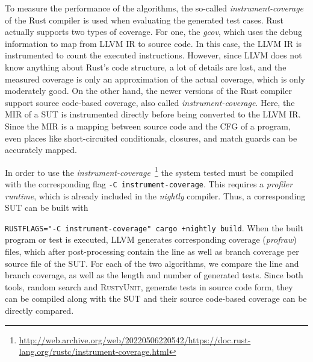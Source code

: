 \documentclass[paper=a4,%
  twoside,%
  BCOR4mm,%
  abstract=true,%
  toc=bibliography,%
  chapterprefix=true,%
  toc=bibliographynumbered,%
  open=right,%
  english,%
  pagesize=pdftex]{scrreprt}
\newcommand{\tech}{\textsc{RustyUnit}\xspace}
\newcommand{\mir}{\ac{MIR}\xspace}
\newcommand{\cfg}{\ac{CFG}\xspace}
\newcommand{\sut}{\ac{SUT}\xspace}
\begin{document}

To measure the performance of the algorithms, the so-called \emph{instrument-coverage} of the Rust compiler is used when evaluating the generated test cases. Rust actually supports two types of coverage. For one, the \emph{gcov}, which uses the debug information to map from LLVM \ac{IR} to source code. In this case, the LLVM \ac{IR} is instrumented to count the executed instructions. However, since LLVM does not know anything about Rust's code structure, a lot of details are lost, and the measured coverage is only an approximation of the actual coverage, which is only moderately good. On the other hand, the newer versions of the Rust compiler support source code-based coverage, also called \emph{instrument-coverage}. Here, the \mir of a \sut is instrumented directly before being converted to the LLVM \ac{IR}. Since the \mir is a mapping between source code and the \cfg of a program, even places like short-circuited conditionals, closures, and match guards can be accurately mapped.

In order to use the \emph{instrument-coverage}~\footnote{\url{http://web.archive.org/web/20220506220542/https://doc.rust-lang.org/rustc/instrument-coverage.html}} the system tested must be compiled with the corresponding flag \texttt{-C instrument-coverage}. This requires a \emph{profiler runtime}, which is already included in the \emph{nightly} compiler. Thus, a corresponding \sut can be built with \raggedright\texttt{RUSTFLAGS="-C instrument-coverage" cargo +nightly build}. When the built program or test is executed, LLVM generates corresponding coverage (\emph{profraw}) files, which after post-processing contain the line as well as branch coverage per source file of the \sut. For each of the two algorithms, we compare the line and branch coverage, as well as the length and number of generated tests. Since both tools, random search and \tech, generate tests in source code form, they can be compiled along with the \sut and their source code-based coverage can be directly compared.
\end{document}
